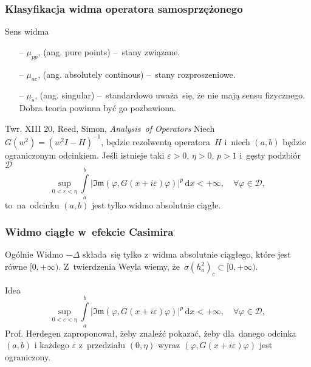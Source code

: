 \documentclass{beamer} \mode<presentation>
\newcommand{\mr}{\mathrm}
\newcommand{\mc}{\mathcal}
\newcommand{\mf}{\mathfrak}
\newcommand{\Del}{\Delta}
\newcommand{\veps}{\varepsilon}
\newcommand{\vp}{\varphi}
\newcommand{\si}{\sigma}
\newcommand{\D}{\mc{D}}
\newcommand{\sset}{\subset}
\newcommand{\Imag}{\mf{Im}}
\newcommand{\de}{\mr{d}}
\newcommand{\Int}{\int\limits}
\newcommand{\dx}{\de x}
\providecommand{\absj}[1]{\lvert #1 \rvert}
\begin{document}
\begin{frame}
  \frametitle{Klasyfikacja widma operatora samosprzężonego}

  \begin{block}{Sens widma}
    \begin{itemize}
    \item[--] $\mu_{ pp }$, (ang. pure points) --~stany związane.
    \item[--] $\mu_{ ac }$, (ang. absolutely continous) --~stany
      rozproszeniowe. %
    \item[--] $\mu_{ s }$, (ang. singular) --~standardowo uważa~się,
      że nie mają sensu fizycznego. Dobra teoria powinna być go
      pozbawiona.
    \end{itemize}
    
  \end{block}

  \begin{block}{Twr. XIII 20, Reed, Simon, \emph{Analysis~of Operators}}
    Niech $G( w^{ 2 } ) = ( w^{ 2 } I - H )^{ -1 }$, będzie rezolwentą
    operatora~$H$ i~niech $(a , b)$ będzie ograniczonym odcinkiem.
    Jeśli istnieje taki $\veps > 0$, $\eta > 0$, $p > 1$ i~gęsty
    podzbiór~$\D$
    \begin{equation}
      \label{eq:17}
      \sup_{ 0 < \veps < \eta } \Int_{ a }^{ b }
      \absj{ \Imag( \vp, G( x + i \veps ) \vp ) }^{ p } \, \dx < +\infty,
      \quad \forall \vp \in \D,
    \end{equation}
    to~na~odcinku $( a, b )$ jest tylko widmo absolutnie ciągłe.
  \end{block}
  
\end{frame}



\begin{frame}
  \frametitle{Widmo ciągłe w~efekcie Casimira}

  \begin{block}{Ogólnie}
    Widmo $-\Del$ składa~się tylko z~widma absolutnie ciągłego, które
    jest równe $[ 0, +\infty )$. Z~twierdzenia Weyla wiemy,
    że~$\si( h_{ a }^{ 2 } )_{ c } \sset [ 0, +\infty )$.
  \end{block}

  \begin{block}{Idea}
    \begin{equation}
      \label{eq:17}
      \sup_{ 0 < \veps < \eta } \Int_{ a }^{ b }
      \absj{ \Imag( \vp, G( x + i \veps ) \vp ) }^{ p } \, \dx < +\infty,
      \quad \forall \vp \in \D,
    \end{equation}
    Prof. Herdegen zaproponował, żeby znaleźć pokazać, żeby dla~danego
    odcinka $( a, b )$ i każdego $\veps$ z~przedziału $( 0, \eta )$
    wyraz $( \vp, G( x + i \veps ) \vp )$ jest ograniczony.
  \end{block}

\end{frame}
\end{document}
